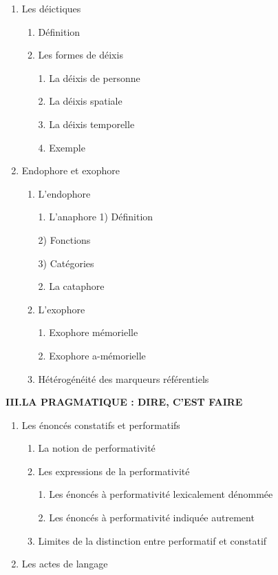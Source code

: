 \begin{keybox}
\begin{enumerate}[label=\arabic*.]
\item Les déictiques
\begin{enumerate}[label=\textcircled{\scriptsize\arabic*}]
\item Définition
\item Les formes de déixis\par 1. La déixis de personne\par 2. La déixis spatiale\par 3. La déixis temporelle\par 4. Exemple
\end{enumerate}
\item Endophore et exophore
\begin{enumerate}[label=\textcircled{\scriptsize\arabic*}]
\item L’endophore\par 1. L’anaphore
\tcbbreak
{}
\hspace*{1em}1) Définition\par\hspace*{1em}2) Fonctions\par\hspace*{1em}3) Catégories\par 2. La cataphore
\item L’exophore\par 1. Exophore mémorielle\par 2. Exophore a-mémorielle
\item Hétérogénéité des marqueurs référentiels
\end{enumerate}
\end{enumerate}
\textbf{III.\quad LA PRAGMATIQUE : DIRE, C’EST FAIRE}
\begin{enumerate}[label=\arabic*.]
\item Les énoncés constatifs et performatifs
\begin{enumerate}[label=\textcircled{\scriptsize\arabic*}]
\item La notion de performativité
\item Les expressions de la performativité\par 1. Les énoncés à performativité lexicalement dénommée\par 2. Les énoncés à performativité indiquée autrement
\item Limites de la distinction entre performatif et constatif
\end{enumerate}
\item Les actes de langage
\begin{enumerate}[label=\textcircled{\scriptsize\arabic*}]

\end{enumerate}
\end{enumerate}
\end{keybox}
